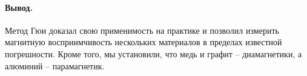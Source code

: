 \documentclass{../lab_class}
\begin{document}
\paragraph{Вывод.}
Метод Гюи доказал свою применимость на практике и позволил измерить магнитную восприимчивость нескольких материалов в пределах известной погрешности. Кроме того, мы установили, что медь и графит -- диамагнетики, а алюминий -- парамагнетик.
\end{document}
